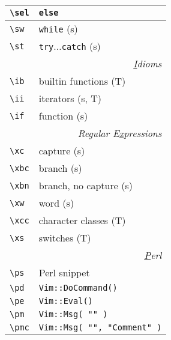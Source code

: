 \documentclass[oneside,10pt,landscape,DIV16]{scrartcl}
\begin{document}
\begin{multicols}{3}
\begin{center}
\begin{tabular}[]{|p{11mm}|p{58mm}|}
\hline \verb'\sel'    & \verb'else'                                      \\
\hline \verb'\sw'     & \verb'while'                                     \hfill (s)\\
\hline \verb'\st'     & \verb'try'$\ldots$\verb'catch'                   \hfill (s)\\
\hline
\hline
\multicolumn{2}{|r|}{\textsl{\underline{I}dioms}}                 \\[1.0ex]
\hline \verb'\ib' & builtin functions         \hfill (T)\\
\hline \verb'\ii' & iterators                 \hfill (s, T)\\
\hline \verb'\if' & function                  \hfill (s)\\
\hline
\hline
\multicolumn{2}{|r|}{\textsl{Regular E\underline{x}pressions}}     \\[1.0ex]
\hline \verb'\xc'  & capture                 \hfill (s)\\
\hline \verb'\xbc' & branch                  \hfill (s)\\
\hline \verb'\xbn' & branch, no capture      \hfill (s)\\
\hline \verb'\xw'  & word                    \hfill (s)\\
\hline \verb'\xcc' & character classes       \hfill (T)\\
\hline \verb'\xs'  & switches                \hfill (T)\\
\hline
\hline
\multicolumn{2}{|r|}{\textsl{\underline{P}erl}}                       \\[1.0ex]
\hline \verb'\ps'   & Perl snippet                       \\
\hline \verb'\pd'   & \texttt{Vim::DoCommand()}          \\
\hline \verb'\pe'   & \texttt{Vim::Eval()}               \\
\hline \verb'\pm'   & \texttt{Vim::Msg( "" )           } \\
\hline \verb'\pmc'  & \texttt{Vim::Msg( "", "Comment" )} \\

\end{tabular}
\end{center}
\end{multicols}
\end{document}
